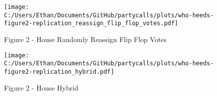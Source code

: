 \documentclass[12pt]{article}
\begin{document}
\begin{figure}[h]
	\caption{Figure 2 - House Randomly Reassign Flip Flop Votes}
	\centering
	\texttt{[image: C:/Users/Ethan/Documents/GitHub/partycalls/plots/who-heeds-figure2-replication\_reassign\_flip\_flop\_votes.pdf]}
	
\end{figure}

\begin{figure}[h]
	\caption{Figure 2 - House Hybrid}
	\centering
	\texttt{[image: C:/Users/Ethan/Documents/GitHub/partycalls/plots/who-heeds-figure2-replication\_hybrid.pdf]}
	
\end{figure}	
\end{document}
